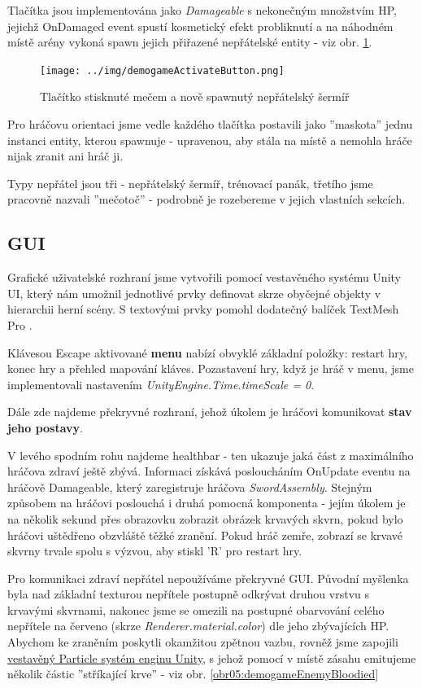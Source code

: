 Tlačítka jsou implementována jako \textit{Damageable} s nekonečným množstvím \acs{HP}, jejichž OnDamaged event spustí kosmetický efekt probliknutí a na náhodném místě arény vykoná spawn jejich přiřazené nepřátelské entity - viz obr. \ref{obr05:demogameActivateButton}. 
\begin{figure}[h!]\centering
  \center
  \texttt{[image: ../img/demogameActivateButton.png]}
  \caption{Tlačítko stisknuté mečem a nově spawnutý nepřátelský šermíř}
  \label{obr05:demogameActivateButton}
\end{figure} 

Pro hráčovu orientaci jsme vedle každého tlačítka postavili jako ''maskota'' jednu instanci entity, kterou spawnuje - upravenou, aby stála na místě a nemohla hráče nijak zranit ani hráč ji.

Typy nepřátel jsou tři - nepřátelský šermíř, trénovací panák, třetího jsme pracovně nazvali ''mečotoč'' - podrobně je rozebereme v jejich vlastních sekcích.


\subsection{GUI}

Grafické uživatelské rozhraní jsme vytvořili pomocí vestavěného systému Unity UI, který nám umožnil jednotlivé prvky definovat skrze obyčejné objekty v hierarchii herní scény. S textovými prvky pomohl dodatečný balíček TextMesh Pro \cite{TextMeshPro}.
\bigbreak

Klávesou Escape aktivované \textbf{menu} nabízí obvyklé základní položky: restart hry, konec hry a přehled mapování kláves.
Pozastavení hry, když je hráč v menu, jsme implementovali nastavením \textit{UnityEngine.Time.timeScale = 0}.
\bigbreak

Dále zde najdeme překryvné rozhraní, jehož úkolem je hráčovi komunikovat \textbf{stav jeho postavy}. 

V levého spodním rohu najdeme healthbar - ten ukazuje jaká část z maximálního hráčova zdraví ještě zbývá. Informaci získává posloucháním OnUpdate eventu na hráčově Damageable, který zaregistruje hráčova \textit{SwordAssembly}. Stejným způsobem na hráčovi poslouchá i druhá pomocná komponenta - jejím úkolem je na několik sekund přes obrazovku zobrazit obrázek krvavých skvrn, pokud bylo hráčovi uštědřeno obzvláště těžké zranění. Pokud hráč zemře, zobrazí se krvavé skvrny trvale spolu s výzvou, aby stiskl 'R' pro restart hry.

Pro komunikaci zdraví nepřátel nepoužíváme překryvné GUI. Původní myšlenka byla nad základní texturou nepřítele postupně odkrývat druhou vrstvu s krvavými skvrnami, nakonec jsme se omezili na postupné obarvování celého nepřítele na červeno (skrze \textit{Renderer.material.color}) dle jeho zbývajících HP. Abychom ke zraněním poskytli okamžitou zpětnou vazbu, rovněž jsme zapojili \href{https://docs.unity3d.com/2022.2/Documentation/Manual/Built-inParticleSystem.html}{vestavěný Particle systém enginu Unity}, s jehož pomocí v místě zásahu emitujeme několik částic ''stříkající krve'' - viz obr. \ref{obr05:demogameEnemyBloodied}

